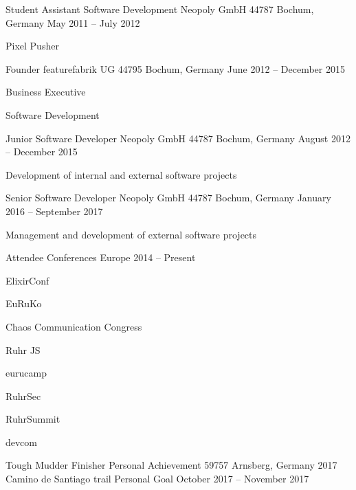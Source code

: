 \documentclass[]{awesome-cv}
\begin{document}
\vspace{-2mm}
\begin{cventries}
	\cventry
	{Student Assistant Software Development}
	{Neopoly GmbH}
	{44787 Bochum, Germany}
	{May 2011 – July 2012}
	{\begin{cvitems}
		\item {Pixel Pusher}
		\end{cvitems}}
	\cventry
	{Founder}
	{featurefabrik UG}
	{44795 Bochum, Germany}
	{June 2012 – December 2015}
	{\begin{cvitems}
		\item {Business Executive}
		\item {Software Development}
		\end{cvitems}}
	\cventry
	{Junior Software Developer}
	{Neopoly GmbH}
	{44787 Bochum, Germany}
	{August 2012 – December 2015}
	{\begin{cvitems}
		\item {Development of internal and external software projects}
		\end{cvitems}}
	\cventry
	{Senior Software Developer}
	{Neopoly GmbH}
	{44787 Bochum, Germany}
	{January 2016 – September 2017}
	{\begin{cvitems}
		\item {Management and development of external software projects}
		\end{cvitems}}
	\cventry
	{Attendee}
	{Conferences}
	{Europe}
	{2014 – Present}
	{\begin{cvitems}
		\item {ElixirConf}
		\item {EuRuKo}
		\item {Chaos Communication Congress}
		\item {Ruhr JS}
		\item {eurucamp}
		\item {RuhrSec}
		\item {RuhrSummit}
		\item {devcom}
		\end{cvitems}}
	\cventry
	{Tough Mudder Finisher}
	{Personal Achievement}
	{59757 Arnsberg, Germany}
	{2017}
	{}
	\cventry
	{Camino de Santiago trail}
	{Personal Goal}
	{}
	{October 2017 – November 2017}
	{}
\end{cventries}

\newpage
\end{document}
